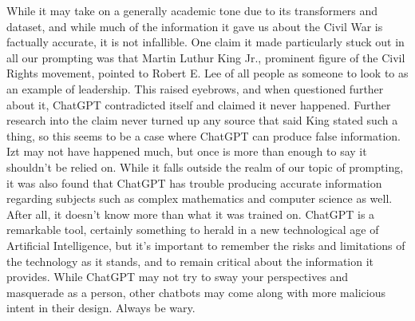 \documentclass[letterpaper, 10pt, conference]{ieeeconf}
\begin{document}
        While it may take on a generally academic tone due to its transformers and dataset, and while much of the information it gave us about the Civil War is factually accurate, it is not infallible. One claim it made particularly stuck out in all our prompting was that Martin Luthur King Jr., prominent figure of the Civil Rights movement, pointed to Robert E. Lee of all people as someone to look to as an example of leadership. This raised eyebrows, and when questioned further about it, ChatGPT contradicted itself and claimed it never happened. Further research into the claim never turned up any source that said King stated such a thing, so this seems to be a case where ChatGPT can produce false information. Izt may not have happened much, but once is more than enough to say it shouldn’t be relied on. While it falls outside the realm of our topic of prompting, it was also found that ChatGPT has trouble producing accurate information regarding subjects such as complex mathematics and computer science as well. After all, it doesn’t know more than what it was trained on.
        ChatGPT is a remarkable tool, certainly something to herald in a new technological age of Artificial Intelligence, but it’s important to remember the risks and limitations of the technology as it stands, and to remain critical about the information it provides. While ChatGPT may not try to sway your perspectives and masquerade as a person, other chatbots may come along with more malicious intent in their design. Always be wary.

    
    
    \nocite{*}
\end{document}
